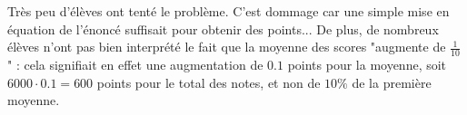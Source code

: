Très peu d'élèves ont tenté le problème. C'est dommage car une simple mise en équation de l'énoncé suffisait pour obtenir des points... De plus, de nombreux élèves n'ont pas bien interprété le fait que la moyenne des scores "augmente de $\frac 1{10}$" : cela signifiait en effet une augmentation de $0.1$ points pour la moyenne, soit $6000\cdot 0.1=600$ points pour le total des notes, et non de $10 \%$ de la première moyenne.